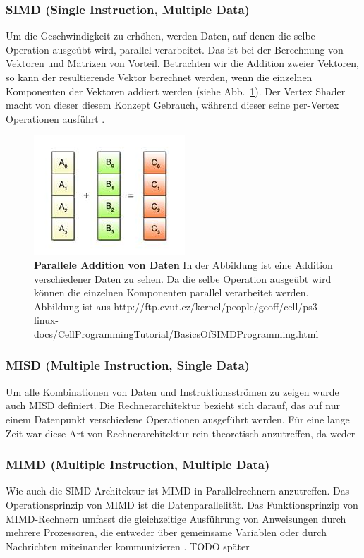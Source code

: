 \subsubsection*{SIMD (Single Instruction, Multiple Data)}
Um die Geschwindigkeit zu erhöhen, werden Daten, auf denen die selbe Operation ausgeübt wird, parallel verarbeitet.
Das ist bei der Berechnung von Vektoren und Matrizen von Vorteil.
Betrachten wir die Addition zweier Vektoren, so kann der resultierende Vektor berechnet werden, wenn die einzelnen Komponenten der Vektoren addiert werden (siehe Abb.~\ref{fig:simd_pattern}). Der Vertex Shader macht von dieser diesem Konzept Gebrauch, während dieser seine per-Vertex Operationen ausführt \cite{DalCin1996}.
\begin{figure}[htb]
  \centering  
  \includegraphics[scale=1.0]{Bilder/Simd_pattern.jpg}
  \caption[SIMD Pattern]{\textbf{Parallele Addition von Daten} In der Abbildung ist eine Addition verschiedener Daten zu sehen. Da die selbe Operation ausgeübt wird können die einzelnen Komponenten parallel verarbeitet werden.
  Abbildung ist aus http://ftp.cvut.cz/kernel/people/geoff/cell/ps3-linux-docs/CellProgrammingTutorial/BasicsOfSIMDProgramming.html }
  \label{fig:simd_pattern}
\end{figure} 
\subsubsection*{MISD (Multiple Instruction, Single Data)}
Um alle Kombinationen von Daten und Instruktionsströmen zu zeigen wurde auch MISD definiert.
Die Rechnerarchitektur bezieht sich darauf, das auf nur einem Datenpunkt verschiedene Operationen ausgeführt werden.
Für eine lange Zeit war diese Art von Rechnerarchitektur rein theoretisch anzutreffen, da weder 
\subsubsection*{MIMD (Multiple Instruction, Multiple Data)}
Wie auch die SIMD Architektur ist MIMD in Parallelrechnern anzutreffen.
Das Operationsprinzip von MIMD ist die Datenparallelität.
Das Funktionsprinzip von MIMD-Rechnern umfasst die gleichzeitige Ausführung von Anweisungen durch mehrere Prozessoren, die entweder über gemeinsame Variablen oder durch Nachrichten miteinander kommunizieren \cite{DalCin1996}.
TODO später \cite{Jakob2017} \newpage

